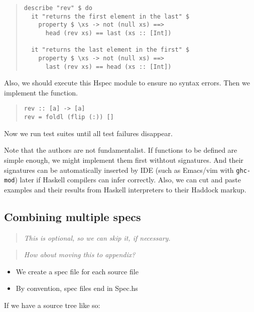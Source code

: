 \documentclass[preprint]{sigplanconf}
\newcommand{\hspec}{Hspec}
\begin{document}
\begin{quote}
\small
\begin{verbatim}
describe "rev" $ do
  it "returns the first element in the last" $
    property $ \xs -> not (null xs) ==>
      head (rev xs) == last (xs :: [Int])

  it "returns the last element in the first" $
    property $ \xs -> not (null xs) ==>
      last (rev xs) == head (xs :: [Int])
\end{verbatim}
\end{quote}

\noindent Also, we should execute this \hspec{} module
to ensure no syntax errors.
Then we implement the function.

\begin{quote}
\small
\begin{verbatim}
rev :: [a] -> [a]
rev = foldl (flip (:)) []
\end{verbatim}
\end{quote}

\noindent Now we run test suites until
all test failures disappear.

Note that the authors are not fundamentalist.
If functions to be defined are simple enough,
we might implement them first withtout signatures.
And their signatures can be automatically
inserted by IDE (such as Emacs/vim with {\tt ghc-mod}) later
if Haskell compilers can infer correctly.
Also, we can cut and paste examples and their results
from Haskell interpreters to their Haddock markup.

\subsection{Combining multiple specs}

\begin{quote}
\emph{This is optional, so we can skip it, if necessary.}
\end{quote}

\begin{quote}
\emph{How about moving this to appendix?}
\end{quote}

\begin{itemize}
\item We create a spec file for each source file
\item By convention, spec files end in Spec.hs
\end{itemize}

\noindent If we have a source tree like so:
\end{document}
